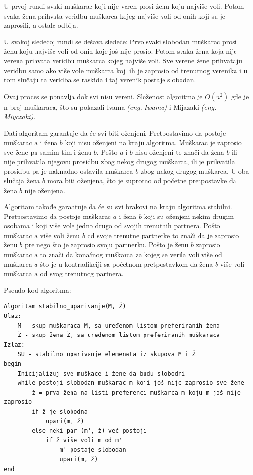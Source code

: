 \documentclass[a4paper]{article}
\begin{document}
U prvoj rundi svaki muškarac koji nije veren prosi ženu koju najviše voli. Potom svaka žena prihvata veridbu muškarca kojeg najviše voli od onih koji su je zaprosili, a ostale odbija.

U svakoj sledećoj rundi se dešava sledeće: Prvo svaki slobodan muškarac prosi ženu koju najviše voli od onih koje još nije prosio. Potom svaka žena koja nije verena prihvata veridbu muškarca kojeg najviše voli. Sve verene žene prihvataju veridbu samo ako više vole muškarca koji ih je zaprosio od trenutnog verenika i u tom slučaju ta veridba se raskida i taj verenik postaje slobodan. 

Ovaj proces se ponavlja dok svi nisu vereni. Složenost algoritma je $O(n^2)$ gde je n broj muškaraca, što su pokazali Ivama \textit{(eng. Iwama)} i Mijazaki \textit{(eng. Miyazaki)}\cite{slozenost}. 

Dati algoritam garantuje da će svi biti oženjeni. Pretpostavimo da postoje muškarac $a$ i žena $b$ koji nisu oženjeni na kraju algoritma. Muškarac je zaprosio sve žene pa samim tim i ženu $b$. Pošto $a$ i $b$ nisu oženjeni to znači da žena $b$ ili nije prihvatila njegovu prosidbu zbog nekog drugog muškarca, ili je prihvatila prosidbu pa je naknadno ostavila muškarca $b$ zbog nekog drugog muškarca. U oba slučaja žena $b$ mora biti oženjena, što je suprotno od početne pretpostavke da žena $b$ nije oženjena.

Algoritam takođe garantuje da će su svi brakovi na kraju algoritma stabilni. Pretpostavimo da postoje muškarac $a$ i žena $b$ koji su oženjeni nekim drugim osobama i koji više vole jedno drugo od svojih trenutnih partnera. Pošto muškarac $a$ više voli ženu $b$ od svoje trenutne partnerke to znači da je zaprosio ženu $b$ pre nego što je zaprosio svoju partnerku. Pošto je ženu $b$ zaprosio muškarac $a$ to znači da konačnog muškarca za kojeg se verila voli više od muškarca $a$ što je u kontradikciji sa početnom pretpostavkom da žena $b$ više voli muškarca $a$ od svog trenutnog partnera.

\newpage

Pseudo-kod algoritma:
\begin{verbatim}
Algoritam stabilno_uparivanje(M, Ž)
Ulaz:
	M - skup muškaraca M, sa uređenom listom preferiranih žena
	Ž - skup žena Ž, sa uređenom listom preferiranih muškaraca
Izlaz:
	SU - stabilno uparivanje elemenata iz skupova M i Ž
begin
    Inicijalizuj sve muškace i žene da budu slobodni
    while postoji slobodan muškarac m koji još nije zaprosio sve žene
        ž = prva žena na listi preferenci muškarca m koju m još nije zaprosio
        if ž je slobodna
            upari(m, ž)
        else neki par (m', ž) već postoji
            if ž više voli m od m'
                m' postaje slobodan
                upari(m, ž)
end
\end{verbatim}
\end{document}
